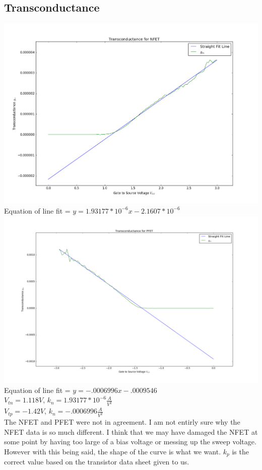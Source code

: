 \documentclass[12pt, oneside]{article}
\begin{document}
\subsection{Transconductance}
\begin{center}
\includegraphics[scale=.35]{nfet_a}\\
Equation of line fit = $y=1.93177*10^{-6}x-2.1607*10^{-6}$\\

\includegraphics[scale=.35]{pfet_a}\\
Equation of line fit = $y=-.0006996x-.0009546$\\

$V_{tn} = 1.118V$, $k_n= 1.93177*10^{-6} \frac{A}{V^2}$\\
$V_{tp} = -1.42V$, $k_n= -.0006996 \frac{A}{V^2}$\\
The NFET and PFET were not in agreement. I am not entirly sure why the NFET data is so much different. I think that we may have damaged the NFET at some point by having too large of a bias voltage or messing up the sweep voltage. However with this being said, the shape of the curve is what we want. $k_p$ is the correct value based on the transistor data sheet given to us.
\end{center}
\end{document}
